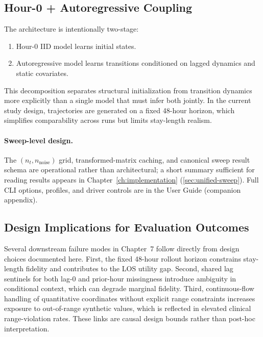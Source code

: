 \subsection{Hour-0 + Autoregressive Coupling}

The architecture is intentionally two-stage:
\begin{enumerate}\tightlist
    \item Hour-0 IID model learns initial states.
    \item Autoregressive model learns transitions conditioned on lagged dynamics and static covariates.
\end{enumerate}

This decomposition separates structural initialization from transition dynamics more explicitly than a single model that must infer both jointly.
In the current study design, trajectories are generated on a fixed 48-hour horizon, which simplifies comparability across runs but limits stay-length realism.

\paragraph{Sweep-level design.}
The $(n_t, n_{\text{noise}})$ grid, transformed-matrix caching, and canonical sweep result schema are operational rather than architectural; a short summary sufficient for reading results appears in Chapter~\ref{ch:implementation} (\ref{sec:unified-sweep}). Full CLI options, profiles, and driver controls are in the User Guide (companion appendix).

\subsection{Design Implications for Evaluation Outcomes}

Several downstream failure modes in Chapter~7 follow directly from design choices documented here. First, the fixed 48-hour rollout horizon constrains stay-length fidelity and contributes to the LOS utility gap. Second, shared lag sentinels for both lag-0 and prior-hour missingness introduce ambiguity in conditional context, which can degrade marginal fidelity. Third, continuous-flow handling of quantitative coordinates without explicit range constraints increases exposure to out-of-range synthetic values, which is reflected in elevated clinical range-violation rates. These links are causal design bounds rather than post-hoc interpretation.

